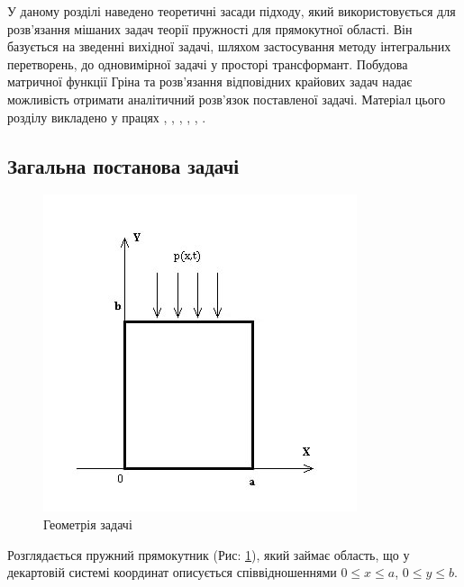 У даному розділі наведено теоретичні засади підходу, який використовується для розв'язання мішаних задач теорії пружності для прямокутної області.
Він базується на зведенні вихідної задачі, шляхом застосування методу інтегральних перетворень, до одновимірної задачі у просторі трансформант.
Побудова матричної функції Гріна та розв'язання відповідних крайових задач надає можливість отримати аналітичний розв'язок поставленої задачі.
Матеріал цього розділу викладено у працях
\cite{pozhylenkov_1}, \cite{pozhylenkov_2}, \cite{pozhylenkov_3}, \cite{pozhylenkov_4}, \cite{pozhylenkov_5}, \cite{pozhylenkov_6}.

\subsection{Загальна постанова задачі}
\begin{figure}[h]
    \begin{center}
        \includegraphics[scale=1]{images/geometry/image_4.jpg}
    \end{center}
    \caption{Геометрія задачі}\label{geom_gen}
\end{figure}
Розглядається пружний прямокутник (Рис: \ref{geom_gen}), який займає область, що у декартовій системі координат описується співвідношеннями $0 \le x \le a$, $0 \le y \le b$.

